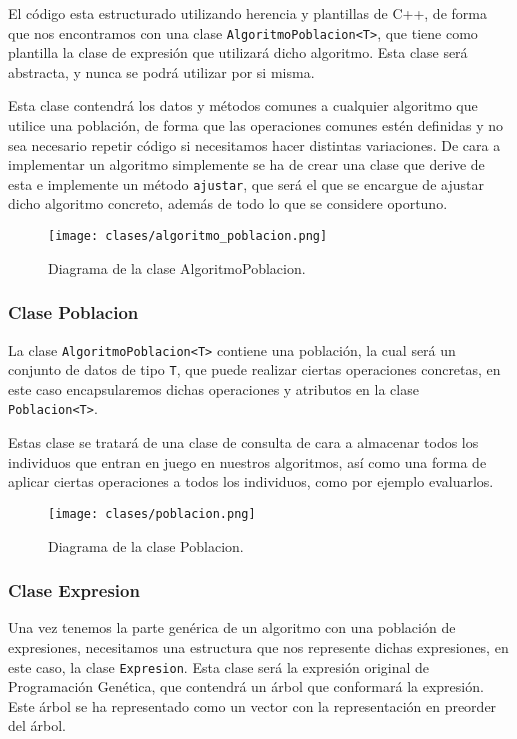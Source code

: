 El código esta estructurado utilizando herencia y plantillas de C++, de forma que nos encontramos con una clase \texttt{AlgoritmoPoblacion<T>}, que tiene como plantilla la clase de expresión que utilizará dicho algoritmo. Esta clase será abstracta, y nunca se podrá utilizar por si misma.

Esta clase contendrá los datos y métodos comunes a cualquier algoritmo que utilice una población, de forma que las operaciones comunes estén definidas y no sea necesario repetir código si necesitamos hacer distintas variaciones. De cara a implementar un algoritmo simplemente se ha de crear una clase que derive de esta e implemente un método \texttt{ajustar}, que será el que se encargue de ajustar dicho algoritmo concreto, además de todo lo que se considere oportuno.

\begin{figure}[H]
	 \centering
	 \texttt{[image: clases/algoritmo\_poblacion.png]}
	 \caption{Diagrama de la clase AlgoritmoPoblacion.}
	\label{fig:diagrama_clase_algoritmo_poblacion}
\end{figure}


\subsubsection{Clase Poblacion}

La clase \texttt{AlgoritmoPoblacion<T>} contiene una población, la cual será un conjunto de datos de tipo \texttt{T}, que puede realizar ciertas operaciones concretas, en este caso encapsularemos dichas operaciones y atributos en la clase \texttt{Poblacion<T>}.

Estas clase se tratará de una clase de consulta de cara a almacenar todos los individuos que entran en juego en nuestros algoritmos, así como una forma de aplicar ciertas operaciones a todos los individuos, como por ejemplo evaluarlos.

\begin{figure}[H]
	 \centering
	 \texttt{[image: clases/poblacion.png]}
	 \caption{Diagrama de la clase Poblacion.}
	\label{fig:diagrama_clase_poblacion}
\end{figure}

\newpage

\subsubsection{Clase Expresion}

Una vez tenemos la parte genérica de un algoritmo con una población de expresiones, necesitamos una estructura que nos represente dichas expresiones, en este caso, la clase \texttt{Expresion}. Esta clase será la expresión original de Programación Genética, que contendrá un árbol que conformará la expresión. Este árbol se ha representado como un vector con la representación en preorder del árbol.

